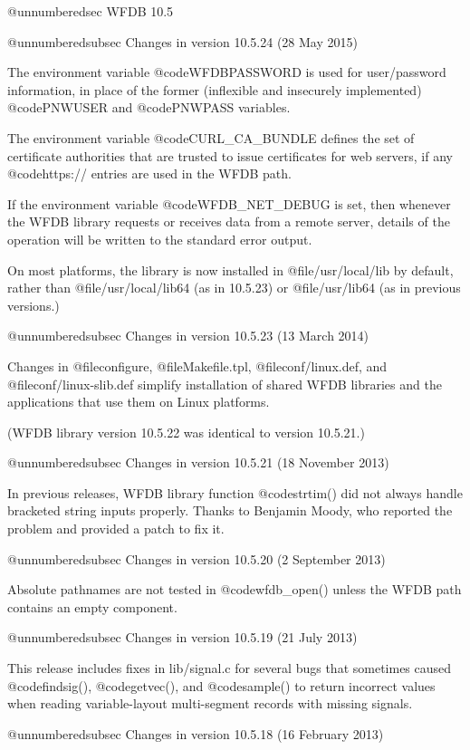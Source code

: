 {{{{{{{{@unnumberedsec WFDB 10.5

@unnumberedsubsec Changes in version 10.5.24 (28 May 2015)

The environment variable @code{WFDBPASSWORD} is used for user/password
information, in place of the former (inflexible and insecurely
implemented) @code{PNWUSER} and @code{PNWPASS} variables.

The environment variable @code{CURL_CA_BUNDLE} defines the set of
certificate authorities that are trusted to issue certificates for web
servers, if any @code{https://} entries are used in the WFDB path.

If the environment variable @code{WFDB_NET_DEBUG} is set, then
whenever the WFDB library requests or receives data from a remote
server, details of the operation will be written to the standard error
output.

On most platforms, the library is now installed in
@file{/usr/local/lib} by default, rather than @file{/usr/local/lib64}
(as in 10.5.23) or @file{/usr/lib64} (as in previous versions.)

@unnumberedsubsec Changes in version 10.5.23 (13 March 2014)

Changes in @file{configure}, @file{Makefile.tpl}, @file{conf/linux.def}, and
@file{conf/linux-slib.def} simplify installation of shared WFDB libraries and
the applications that use them on Linux platforms.

(WFDB library version 10.5.22 was identical to version 10.5.21.)

@unnumberedsubsec Changes in version 10.5.21 (18 November 2013)

In previous releases, WFDB library function @code{strtim()} did not always
handle bracketed string inputs properly.  Thanks to Benjamin Moody,
who reported the problem and provided a patch to fix it.

@unnumberedsubsec Changes in version 10.5.20 (2 September 2013)

Absolute pathnames are not tested in @code{wfdb_open()} unless the WFDB
path contains an empty component.

@unnumberedsubsec Changes in version 10.5.19 (21 July 2013)

This release includes fixes in lib/signal.c for several bugs that sometimes
caused @code{findsig()}, @code{getvec()}, and @code{sample()} to return
incorrect values when reading variable-layout multi-segment records with
missing signals.

@unnumberedsubsec Changes in version 10.5.18 (16 February 2013)

}}}}}}}}
